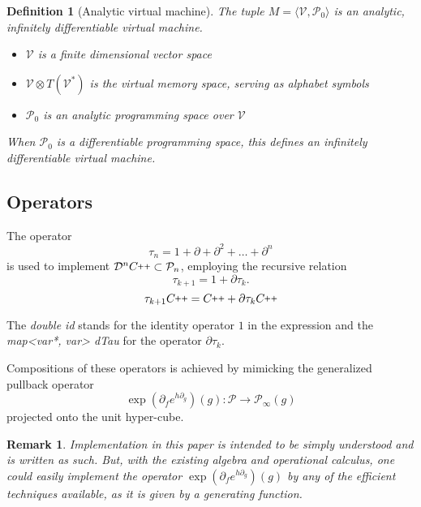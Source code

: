 \documentclass{article}
\newcommand{\VV}{\mathcal{V}}
\newcommand{\CC}{C\nolinebreak\hspace{-.05em}\raisebox{.4ex}{\tiny\bf +}\nolinebreak\hspace{-.10em}\raisebox{.4ex}{\tiny\bf +}}
\def\CC{{C\nolinebreak[4]\hspace{-.05em}\raisebox{.4ex}{\tiny\bf ++}}}
\newcommand{\dP}{\mathcal{P}}
\newcommand{\D}{\partial}
\newcommand{\DD}{\mathcal{D}}
\newcommand{\sumd}{\tau}
\newtheorem{definicija}{Definition}[section]
\newtheorem{opomba}{Remark}[section]
\begin{document}
\begin{definicija}[Analytic virtual machine]
The tuple $M=\langle \VV,\dP_0\rangle$ is an analytic, infinitely  differentiable virtual machine.
   
    \begin{itemize}
    \item
    $\VV$ is a finite dimensional vector space
    \item
    $\VV\otimes T(\VV^*)$ is the virtual memory space, serving as alphabet symbols
    \item
    $\dP_0$ is an analytic programming space over $\VV$
    \end{itemize}
    When $\dP_0$ is a differentiable programming space, this defines an
    infinitely differentiable virtual machine.
  \end{definicija}
  
  \subsection{Operators}
        
        The operator 
        \begin{equation}\label{eq:DD}
          	\sumd_n = 1+\D +\D^2 +\ldots + \D^n 
          \end{equation}
        is used to implement $\DD^n\CC\subset\dP_n$, employing the recursive relation
        \begin{equation}
              \label{eq:rekurzija}
              \sumd_{k+1} = 1+\D\sumd_k.
            \end{equation}
        \begin{equation}
        \sumd_{k+1}\CC = \CC+\D\sumd_k\CC
        \end{equation}
        
        The \emph{double id} stands for the identity operator $1$ in the expression and the \emph{map<var*, var> dTau} for the operator $\D\sumd_k$.
        
        Compositions of these operators is achieved by mimicking the generalized pullback operator
        \begin{equation}\label{eq:opKompo}
          \exp(\D_fe^{h\D_g})(g): \dP\to\dP_\infty(g)
          \end{equation}
          projected onto the unit hyper-cube.
          
          \begin{opomba}
          Implementation in this paper is intended to be simply understood and is written as such. But, with the existing algebra and operational calculus, one could easily implement the operator $\exp(\D_fe^{h\D_g})(g)$ by any of the efficient techniques available, as it is given by a generating function.
          \end{opomba}
        
\end{document}
